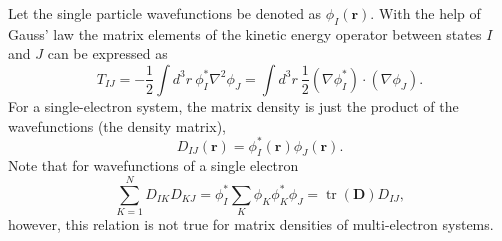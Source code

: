 \documentclass[journal=jpca,manuscript=article,layout=singlecolumn]{achemso}
\DeclareMathOperator{\tr}{tr}
\newcommand\m[1]{\mathbf{#1}}
\renewcommand\vec[1]{\mathbf{#1}}
\begin{document}
Let the single particle wavefunctions be denoted as $\phi_I(\vec{r})$. With the help of Gauss' law
the matrix elements of the kinetic energy operator between states $I$ and $J$ can be expressed as
\begin{equation}
    T_{IJ} = -\frac{1}{2} \int d^3\!r ~ \phi^*_I \nabla^2 \phi_J
    = \int d^3\!r ~ \frac{1}{2} (\nabla \phi^*_I)\cdot (\nabla \phi_J). \label{eqn:kinetic_energy_1e}
\end{equation}
For a single-electron system, the matrix density is just the product of the wavefunctions (the density matrix),
\begin{equation}
 D_{IJ}(\vec{r}) = \phi^*_I(\vec{r}) \phi_J(\vec{r}).
\end{equation}
Note that for wavefunctions of a single electron
\begin{equation}
 \sum_{K=1}^{N} D_{IK} D_{KJ} = \phi^*_I \sum_{K} \phi_{K} \phi^*_{K} \phi_J = \tr(\m{D}) D_{IJ},
\end{equation}
however, this relation is not true for matrix densities of multi-electron systems.
\end{document}
